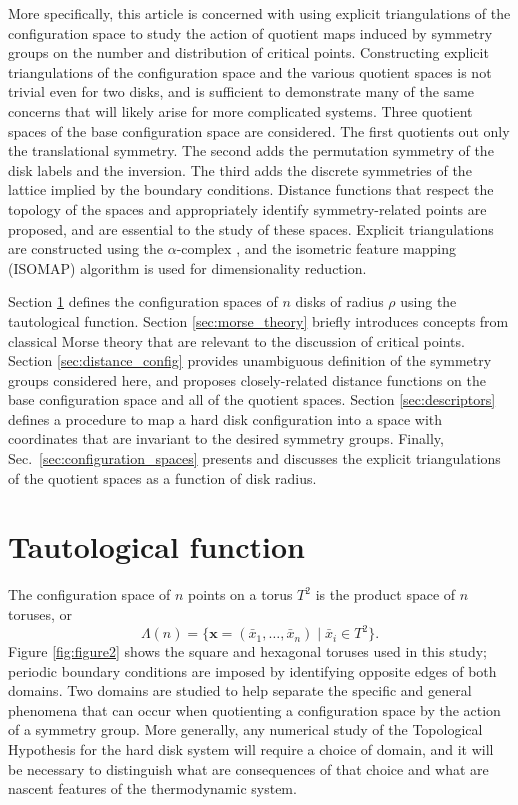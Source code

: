 \documentclass[default,iicol]{sn-jnl}%
\theoremstyle{thmstyleone}%
\theoremstyle{thmstyletwo}%
\theoremstyle{thmstylethree}%
\renewcommand{\vec}[1]{\bar{#1}}
\providecommand{\config}[1]{\mathbf{#1}}
\begin{document}
More specifically, this article is concerned with using explicit triangulations of the configuration space to study the action of quotient maps induced by symmetry groups on the number and distribution of critical points. Constructing explicit triangulations of the configuration space and the various quotient spaces is not trivial even for two disks, and is sufficient to demonstrate many of the same concerns that will likely arise for more complicated systems. Three quotient spaces of the base configuration space are considered. The first quotients out only the translational symmetry. The second adds the permutation symmetry of the disk labels and the inversion. The third adds the discrete symmetries of the lattice implied by the boundary conditions. Distance functions that respect the topology of the spaces and appropriately identify symmetry-related points are proposed, and are essential to the study of these spaces. Explicit triangulations are constructed using the $\alpha$-complex \cite{edelsbrunner1983shape}, and the isometric feature mapping (ISOMAP) algorithm \cite{Tenenbaum2319} is used for dimensionality reduction.

Section \ref{sec:tautological_function} defines the configuration spaces of $n$ disks of radius $\rho$ using the tautological function. Section \ref{sec:morse_theory} briefly introduces concepts from classical Morse theory that are relevant to the discussion of critical points. Section \ref{sec:distance_config} provides unambiguous definition of the symmetry groups considered here, and proposes closely-related distance functions on the base configuration space and all of the quotient spaces. Section \ref{sec:descriptors} defines a procedure to map a hard disk configuration into a space with coordinates that are invariant to the desired symmetry groups. Finally, Sec.\ \ref{sec:configuration_spaces} presents and discusses the explicit triangulations of the quotient spaces as a function of disk radius.

\section{Tautological function}
\label{sec:tautological_function}

The configuration space of $n$ points on a torus $T^2$ is the product space of $n$ toruses, or 
\begin{equation*}
\Lambda(n) = \{ \config{x} = (\vec{x}_1, \dots ,\vec{x}_n) \;\vert\; \vec{x}_i \in T^2 \}.
\label{eq:configuration_space1}
\end{equation*}
Figure \ref{fig:figure2} shows the square and hexagonal toruses used in this study; periodic boundary conditions are imposed by identifying opposite edges of both domains. Two domains are studied to help separate the specific and general phenomena that can occur when quotienting a configuration space by the action of a symmetry group. More generally, any numerical study of the Topological Hypothesis for the hard disk system will require a choice of domain, and it will be necessary to distinguish what are consequences of that choice and what are nascent features of the thermodynamic system.
\end{document}
